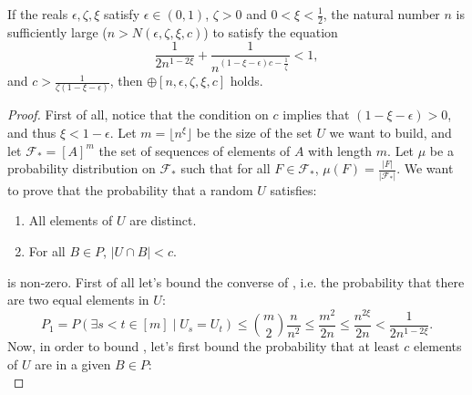         \begin{lemma} \label{lem:n_large_enough_valid_values}
            If the reals $\epsilon, \zeta, \xi$ satisfy $\epsilon \in (0,1)$, $\zeta > 0$ and $0 < \xi < \frac{1}{2}$,
            the natural number $n$ is sufficiently large ($n > N(\epsilon, \zeta, \xi, c)$) to satisfy the equation
                \begin{equation} \label{eq:n_large_enough_valid_values.1}
                    \frac{1}{2n^{1-2\xi}} + \frac{1}{n^{(1 - \xi - \epsilon)c - \frac{1}{\zeta}}} < 1,
                \end{equation}
            and $c > \frac{1}{\zeta (1 - \xi - \epsilon)}$,
            then $\oplus[n, \epsilon, \zeta, \xi, c]$ holds.
            \begin{proof}
                First of all, notice that the condition on $c$ implies that $(1 - \xi - \epsilon) > 0$, and thus $\xi < 1 -\epsilon$.
                Let $m = \lfloor n^\xi \rfloor$ be the size of the set $U$ we want to build, and let $\mathcal{F}_* = [A]^m$
                the set of sequences of elements of $A$ with length $m$.
                Let $\mu$ be a probability distribution on $\mathcal{F}_*$ such that for all $F \in \mathcal{F}_*$,
                $\mu(F) = \frac{|F|}{|\mathcal{F}_*|}$.
                We want to prove that the probability that a random $U$ satisfies:
                \begin{enumerate}
                    \item\label{itm:n_large_enough_valid_values.1} All elements of $U$ are distinct.
                    \item\label{itm:n_large_enough_valid_values.2} For all $B \in P$, $|U \cap B| < c$.
                \end{enumerate}
                is non-zero.
                First of all let's bound the converse of , i.e. the probability that there are two equal elements
                in $U$:
                \[
                    P_1 = P(\exists s < t \in [m] \mid U_s = U_t)
                        \leq {m \choose 2} \frac{n}{n^2}
                        \leq \frac{m^2}{2n}
                        \leq \frac{n^{2\xi}}{2n}
                        < \frac{1}{2n^{1-2\xi}}.
                \]
                Now, in order to bound , let's first bound the probability that at least $c$ elements of
                $U$ are in a given $B \in P$:
                \[
\]
\end{proof}
\end{lemma}
